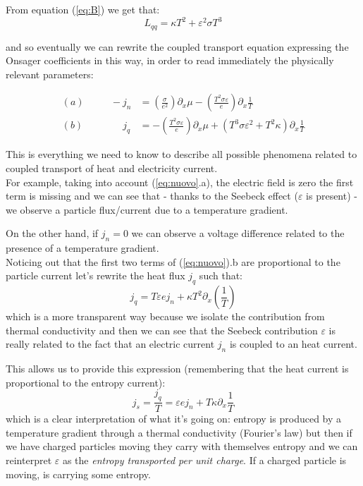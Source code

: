\documentclass[\main/main.tex]{subfiles}
\begin{document}
 From equation (\ref{eq:B}) we get that:
 \begin{equation}
     L_{qq}=\kappa T^2 + \varepsilon^2\sigma T^3
 \end{equation}
 
and so eventually we can rewrite the coupled transport equation expressing the Onsager coefficients in this way, in order to read immediately the physically relevant parameters:

\begin{equation}
\begin{aligned}
(a) \qquad \,\,\,\, -j_{n} &=\left(\frac{\sigma}{e^{2}}\right) \partial_{x} \mu-\left(\frac{T^{2} \sigma \varepsilon}{e}\right) \partial_{x} \frac{1}{T} \qquad \qquad  \\
(b) \qquad \qquad j_{q} &=-\left(\frac{T^2 \sigma \varepsilon}{e}\right) \partial_{x} \mu+\left(T^{3} \sigma \varepsilon^{2}+T^{2} \kappa\right) \partial_{x} \frac{1}{T}
\label{eq:nuovo}
\end{aligned}
\end{equation}

This is everything we need to know to describe all possible phenomena related to coupled transport of heat and electricity current. \\

For example, taking into account (\ref{eq:nuovo}.a), the electric field is zero the first term is missing and we can see that - thanks to the Seebeck effect ($\varepsilon$ is present) - we observe a particle flux/current due to a temperature gradient.

On the other hand, if $j_n=0$ we can observe a voltage difference related to the presence of a temperature gradient. \\

Noticing out that the first two terms of (\ref{eq:nuovo}).b are proportional to the particle current let's rewrite the heat flux $j_q$ such that:
\begin{equation}
    j_q=T\varepsilon e j_n + \kappa T^2\partial_x \left(\frac{1}{T}\right)
\end{equation}
which is a more transparent way because we isolate the contribution from thermal conductivity and then we can see that the Seebeck contribution $\varepsilon$ is really related to the fact that an electric current $j_n$ is coupled to an heat current.

This allows us to provide this expression (remembering that the heat current is proportional to the entropy current):
\begin{equation}
    j_{s}=\frac{j_q}{T}=\varepsilon e j_{n}+T \kappa \partial_{x} \frac{1}{T}
\end{equation}
which is a clear interpretation of what it's going on: entropy is produced by  a temperature gradient through a thermal conductivity (Fourier's law) but then if we have charged particles moving they carry with themselves entropy and we can reinterpret $\varepsilon$ as the \textit{entropy transported per unit charge}. If a charged particle is moving, is carrying some entropy.
\end{document}
